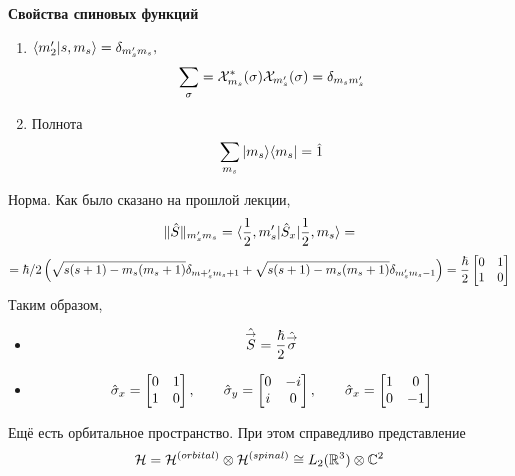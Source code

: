 \textbf{Свойства спиновых функций}
\begin{enumerate}
  \item
  $
    \qs{m'_2}{s, m_s} = \dta_{m_s' m_s},
  $
  $$
    \sum_\sigma = \X_{m_s}^\ast (\sigma) \X_{m_s'}(\sigma) = \dta_{m_s m_s'}
  $$
  \item Полнота
  $$
    \sum_{m_s} \qu{m_s}\uq{m_s} = \Hat 1
  $$
\end{enumerate}
Норма. Как было сказано на прошлой лекции,
  $$
    \|\Hat S\|_{m_s' m_s} =
    \qtri{\frac12, m_s'}{\hat S_x}{\frac12, m_s}
    =
$$
$$
=
    \hbar/2 \left(
        \sqrt{s(s+1) - m_s (m_s + 1)} \dta_{m+_s' m_s + 1} + \sqrt{s(s+1) - m_s ( m_s + 1)} \dta_{m_s' m_s - 1}
    \right) = \dfrac{\hbar}{2} \begin{bmatrix}
                                 0 & 1  \\
                                 1 & 0 \\
                               \end{bmatrix}
  $$
Таким образом,
\begin{itemize}
  \item $$
    \Hat{\vec{S}} = \dfrac{\hbar}{2} \Hat{\vec \sigma}
  $$
  \item
  $$
    \Hat \sigma_x = \begin{bmatrix}
                      0 & 1 \\
                      1 & 0 \\
                    \end{bmatrix},
                    \qquad
    \Hat \sigma_y = \begin{bmatrix}
                      0 & -i \\
                      i & 0 \\
                    \end{bmatrix}, \qquad
    \Hat \sigma_x = \begin{bmatrix}
                      1 & 0 \\
                      0 & -1 \\
                    \end{bmatrix}
  $$
\end{itemize}


Ещё есть орбитальное пространство. При этом справедливо представление
$$
    \H = \H^{(orbital)} \otimes \H^{(spinal)} \cong L_2 (\R^3) \otimes \C^{2}
$$

